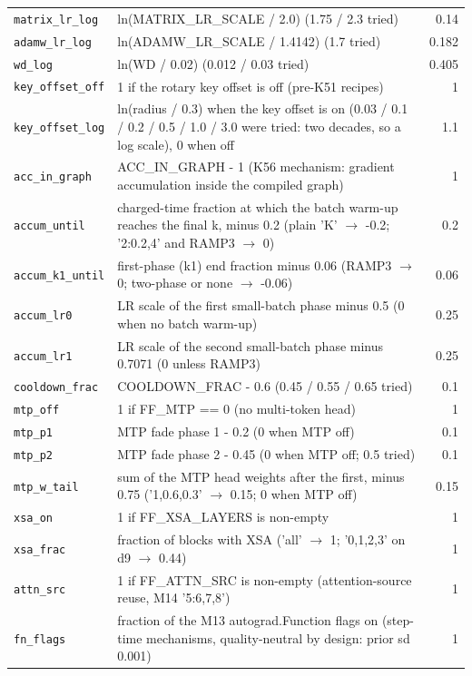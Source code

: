 {\begin{tabular}{@{}lp{10.6cm}r@{}}
\texttt{matrix\_lr\_log} & ln(MATRIX\_LR\_SCALE / 2.0) (1.75 / 2.3 tried) & 0.14 \\
\texttt{adamw\_lr\_log} & ln(ADAMW\_LR\_SCALE / 1.4142) (1.7 tried) & 0.182 \\
\texttt{wd\_log} & ln(WD / 0.02) (0.012 / 0.03 tried) & 0.405 \\
\texttt{key\_offset\_off} & 1 if the rotary key offset is off (pre-K51 recipes) & 1 \\
\texttt{key\_offset\_log} & ln(radius / 0.3) when the key offset is on (0.03 / 0.1 / 0.2 / 0.5 / 1.0 / 3.0 were tried: two decades, so a log scale), 0 when off & 1.1 \\
\texttt{acc\_in\_graph} & ACC\_IN\_GRAPH - 1 (K56 mechanism: gradient accumulation inside the compiled graph) & 1 \\
\texttt{accum\_until} & charged-time fraction at which the batch warm-up reaches the final k, minus 0.2 (plain 'K' $\rightarrow$ -0.2; '2:0.2,4' and RAMP3 $\rightarrow$ 0) & 0.2 \\
\texttt{accum\_k1\_until} & first-phase (k1) end fraction minus 0.06 (RAMP3 $\rightarrow$ 0; two-phase or none $\rightarrow$ -0.06) & 0.06 \\
\texttt{accum\_lr0} & LR scale of the first small-batch phase minus 0.5 (0 when no batch warm-up) & 0.25 \\
\texttt{accum\_lr1} & LR scale of the second small-batch phase minus 0.7071 (0 unless RAMP3) & 0.25 \\
\texttt{cooldown\_frac} & COOLDOWN\_FRAC - 0.6 (0.45 / 0.55 / 0.65 tried) & 0.1 \\
\texttt{mtp\_off} & 1 if FF\_MTP == 0 (no multi-token head) & 1 \\
\texttt{mtp\_p1} & MTP fade phase 1 - 0.2 (0 when MTP off) & 0.1 \\
\texttt{mtp\_p2} & MTP fade phase 2 - 0.45 (0 when MTP off; 0.5 tried) & 0.1 \\
\texttt{mtp\_w\_tail} & sum of the MTP head weights after the first, minus 0.75 ('1,0.6,0.3' $\rightarrow$ 0.15; 0 when MTP off) & 0.15 \\
\texttt{xsa\_on} & 1 if FF\_XSA\_LAYERS is non-empty & 1 \\
\texttt{xsa\_frac} & fraction of blocks with XSA ('all' $\rightarrow$ 1; '0,1,2,3' on d9 $\rightarrow$ 0.44) & 1 \\
\texttt{attn\_src} & 1 if FF\_ATTN\_SRC is non-empty (attention-source reuse, M14 '5:6,7,8') & 1 \\
\texttt{fn\_flags} & fraction of the M13 autograd.Function flags on (step-time mechanisms, quality-neutral by design: prior sd 0.001) & 1 \\

\end{tabular}}
